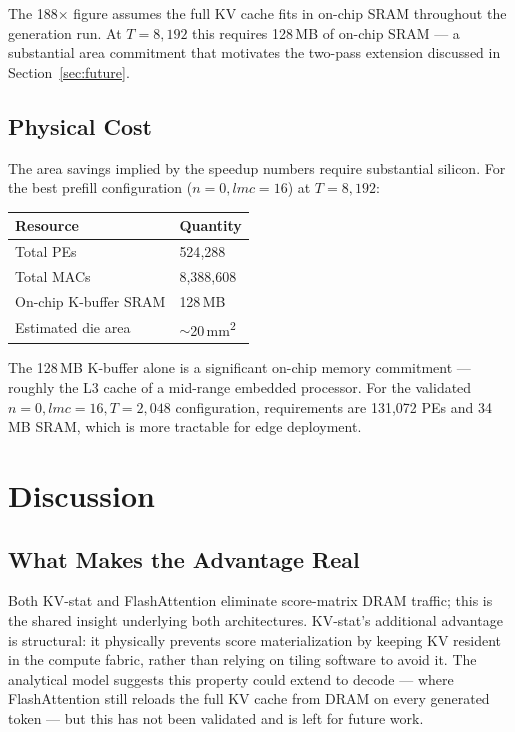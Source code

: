 \documentclass[11pt]{article}
\begin{document}
The 188$\times$ figure assumes the full KV cache fits in on-chip
SRAM throughout the generation run.
At \(T = 8{,}192\) this requires 128\,MB of on-chip SRAM ---
a substantial area commitment that motivates the two-pass
extension discussed in Section~\ref{sec:future}.

\subsection{Physical Cost}

The area savings implied by the speedup numbers require
substantial silicon.
For the best prefill configuration (\(n = 0, lmc = 16\)) at
\(T = 8{,}192\):

\begin{center}
\begin{tabular}{ll}
\toprule
Resource & Quantity \\
\midrule
Total PEs & 524{,}288 \\
Total MACs & 8{,}388{,}608 \\
On-chip K-buffer SRAM & 128\,MB \\
Estimated die area & \(\sim\)20\,mm\textsuperscript{2} \\
\bottomrule
\end{tabular}
\end{center}

The 128\,MB K-buffer alone is a significant on-chip memory
commitment --- roughly the L3 cache of a mid-range embedded
processor.
For the validated \(n = 0, lmc = 16, T = 2{,}048\) configuration,
requirements are 131{,}072 PEs and 34\,MB SRAM, which is
more tractable for edge deployment.

\section{Discussion}

\subsection{What Makes the Advantage Real}

Both KV-stat and FlashAttention eliminate score-matrix DRAM traffic;
this is the shared insight underlying both architectures.
KV-stat's additional advantage is structural: it physically
prevents score materialization by keeping KV resident in the
compute fabric, rather than relying on tiling software to avoid it.
The analytical model suggests this property could extend to decode
--- where FlashAttention still reloads the full KV cache from DRAM
on every generated token --- but this has not been validated and
is left for future work.
\end{document}
